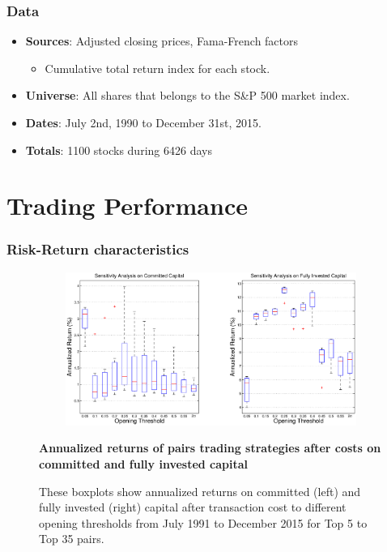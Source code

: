 \documentclass[pdf,10pt,xcolor=dvipsnames,hide notes]{beamer}
\begin{document}
\begin{frame}[label=frame2b]
\frametitle{Data}
\begin{itemize}
	\setlength\itemsep{1em}
	\justifying
	
	\item 	\textbf{Sources}: Adjusted closing prices, Fama-French factors
	\begin{itemize}
		\item Cumulative total return index for each stock.
	\end{itemize}
	\item \textbf{Universe}: All shares that belongs to the S\&P 500 market index.  
	\item \textbf{Dates}: July 2nd, 1990 to December 31st, 2015.
	\item \textbf{Totals}: 1100 stocks during 6426 days

\end{itemize}

\end{frame}



\section{Trading Performance}

\begin{frame}
	\frametitle{Risk-Return characteristics}
	
	\begin{figure}[!ht]
		\centering
		\includegraphics[width=12cm,height=5cm]{Figure1.eps}
		\captionsetup{justification=raggedright,
			singlelinecheck=false
		}
		\caption{\textbf{Annualized returns of pairs trading strategies after costs on committed and fully invested capital}}
		\caption*{\scriptsize These boxplots show annualized returns on committed (left) and fully invested (right) capital after transaction cost to different opening thresholds from July 1991 to December 2015 for Top 5 to Top 35 pairs.}
		\label{fig:fig1}
	\end{figure}

\end{frame}
\end{document}
